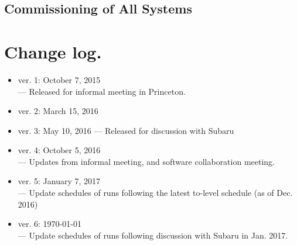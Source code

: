 \documentclass[11pt]{article}
\begin{document}
\renewcommand{\thesubsubsection}{A-\;\arabic{subsubsection}}
\subsection{Commissioning of All Systems}\label{sec:All}


%








\clearpage

\appendix



\section*{Change log.}
\begin{itemize}
\item ver. 1: October 7, 2015 \\
--- Released for informal meeting in Princeton.
\item ver. 2:  March 15, 2016
\item ver. 3: May 10, 2016
--- Released for discussion with Subaru
\item ver. 4: October 5, 2016 \\
--- Updates from informal meeting, and software collaboration meeting.
\item ver. 5: January 7, 2017 \\
--- Update schedules of runs following the latest to-level schedule (as of Dec. 2016)
\item ver. 6: \today \\
--- Update schedules of runs following discussion with Subaru in Jan. 2017.
\end{itemize}
\end{document}
